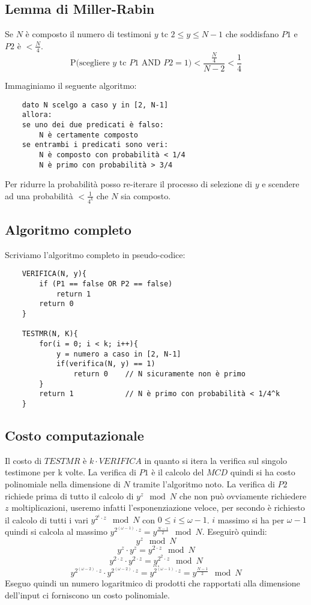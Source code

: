 \subsection{Lemma di Miller-Rabin}
Se $N$ è composto il numero di testimoni $y$ tc $2 \leq y \leq N-1$ che soddisfano $P1$ e $P2$ è $ < \frac{N}{4} $.
$$
    \text{P(scegliere $y$ tc $P1 \text{ AND } P2 = 1$)} < \frac{\frac{N}{4}}{N-2} < \frac{1}{4}
$$

Immaginiamo il seguente algoritmo:
\begin{verbatim}
    dato N scelgo a caso y in [2, N-1]
    allora:
    se uno dei due predicati è falso:
        N è certamente composto
    se entrambi i predicati sono veri:
        N è composto con probabilità < 1/4
        N è primo con probabilità > 3/4
\end{verbatim}

Per ridurre la probabilità posso re-iterare il processo di selezione di $y$ e scendere ad una probabilità
$ < \frac{1}{4^k} $ che $N$ sia composto.

\subsection{Algoritmo completo}
Scriviamo l'algoritmo completo in pseudo-codice:
\begin{verbatim}
    VERIFICA(N, y){
        if (P1 == false OR P2 == false)
            return 1
        return 0
    }
    
    TESTMR(N, K){
        for(i = 0; i < k; i++){
            y = numero a caso in [2, N-1]
            if(verifica(N, y) == 1)
                return 0    // N sicuramente non è primo
        }
        return 1            // N è primo con probabilità < 1/4^k
    }
\end{verbatim}

\subsection{Costo computazionale}
Il costo di $TESTMR$ è $k \cdot VERIFICA$ in quanto si itera la verifica sul singolo testimone per k volte. La verifica di $P1$ è il calcolo del $MCD$ quindi si ha costo polinomiale nella dimensione di $N$ tramite l'algoritmo noto. La verifica di $P2$ richiede prima di tutto il calcolo di $y^z \mod N$ che non può ovviamente richiedere $z$ moltiplicazioni, useremo infatti l'esponenziazione veloce, per secondo è richiesto il calcolo di tutti i vari $y^{2^i \cdot z} \mod N$ con $0 \leq i \leq \omega - 1$. $i$ massimo si ha per $\omega - 1$ quindi si calcola al massimo $y^{2^{(\omega-1)} \cdot z} = y^{\frac{N-1}{2}} \mod N$. Eseguirò quindi:
$$ y^{z} \mod N $$
$$ y^{z} \cdot y^{z} = y^{2 \cdot z} \mod N $$
$$ y^{2 \cdot z} \cdot y^{2 \cdot z} = y^{2^{2} \cdot z} \mod N $$
$$ ... $$
$$ y^{2^{(\omega - 2)} \cdot z} \cdot y^{2^{(\omega - 2)} \cdot z} = y^{2^{(\omega - 1)} \cdot z}  = y^{\frac{N-1}{2}}\mod N $$
Eseguo quindi un numero logaritmico di prodotti che rapportati alla dimensione dell'input ci forniscono un costo polinomiale.

